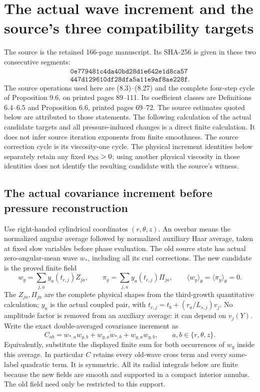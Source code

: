 \section{The actual wave increment and the source's three compatibility targets}
\label{momop:section}

The source is the retained 166-page manuscript. Its SHA-256 is given
in these two consecutive segments:
\[
\begin{gathered}
\texttt{0e779481c4da40bd28d1e642e1d8ca57}\\
\texttt{447d129610df28dfa5a11e9af8ae228f}.
\end{gathered}
\]
The source operations used here are (8.3)--(8.27) and the complete
four-step cycle of Proposition 9.6, on printed pages 89--111.
Its coefficient classes are Definitions 6.4--6.5 and Proposition 6.6,
printed pages 69--72. The source estimates quoted below are attributed
to those statements. The following calculation of the actual candidate
targets and all pressure-induced changes is a direct finite calculation.
It does not infer source iteration exponents from finite smoothness.
The source correction cycle is its viscosity-one cycle. The physical
increment identities below separately retain any fixed
$\nu_{\rm NS}>0$; using another physical viscosity in those identities
does not identify the resulting candidate with the source's witness.

\subsection{The actual covariance increment before pressure reconstruction}

Use right-handed cylindrical coordinates $(r,\theta,z)$. An overbar
means the normalized angular average followed by normalized auxiliary
Haar average, taken at fixed slow variables before phase evaluation.
The old source state has actual zero-angular-mean wave $w_*$, including
all its curl corrections. The new candidate is the proved finite field
\[
 w_y=\sum_{j,a}y_a(t_{c,j})Z_{ja},\qquad
 \pi_y=\sum_{j,a}y_a(t_{c,j})\Pi_{ja},\qquad
 \langle w_y\rangle_\theta=\langle\pi_y\rangle_\theta=0.
\]
The $Z_{ja},\Pi_{ja}$ are the complete physical shapes from the
third-growth quantitative calculation; $y_a$ is the actual coupled
pair, with $t_{c,j}=t_b+(r_a/L_{s,j})v_j$. No amplitude factor is
removed from an auxiliary average: it can depend on $v_j(Y)$.
Write the exact double-averaged covariance increment as
\begin{equation}\label{momop:C}
 C_{ab}=
 \overline{w_{*,a}w_{y,b}+w_{y,a}w_{*,b}+w_{y,a}w_{y,b}},
 \qquad a,b\in\{r,\theta,z\}.
\end{equation}
Equivalently, substitute the displayed finite sum for both occurrences
of $w_y$ inside this average. In particular $C$ retains every old-wave
cross term and every same-label quadratic term. It is symmetric.
All its radial integrals below are finite because the new fields are
smooth and supported in a compact interior annulus. The old field
need only be restricted to this support.

